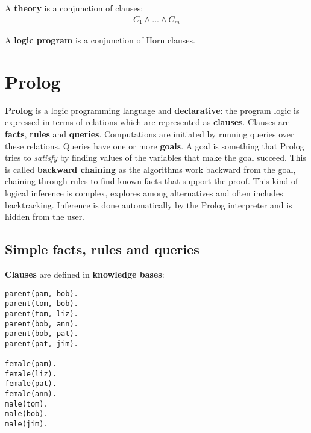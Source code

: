 \documentclass{report}
\begin{document}
A {\bf theory} is a conjunction of clauses:
\begin{align*}
C_1 \wedge ... \wedge C_m
\end{align*}

A {\bf logic program} is a conjunction of Horn clauses.




\section{Prolog}
\label{chapter:prolog}
{\bf Prolog} is a logic programming language and {\bf declarative}: the program logic is expressed in terms of relations which are represented as {\bf clauses}.
Clauses are {\bf facts}, {\bf rules} and {\bf queries}.
Computations are initiated by running queries over these relations.
Queries have one or more {\bf goals}.
A goal is something that Prolog tries to {\em satisfy} by finding values of the variables that make the goal succeed.
This is called {\bf backward chaining} as the algorithms work backward from the goal, chaining through rules to find known facts that support the proof.
This kind of logical inference is complex, explores among alternatives and often includes backtracking. Inference is done automatically by the Prolog interpreter and is hidden from the user.

\subsection{Simple facts, rules and queries}
{\bf Clauses} are defined in {\bf knowledge bases}:
\begin{lstlisting}
parent(pam, bob).
parent(tom, bob).
parent(tom, liz).
parent(bob, ann).
parent(bob, pat).
parent(pat, jim).

female(pam).
female(liz).
female(pat).
female(ann).
male(tom).
male(bob).
male(jim).
\end{lstlisting}
\end{document}
